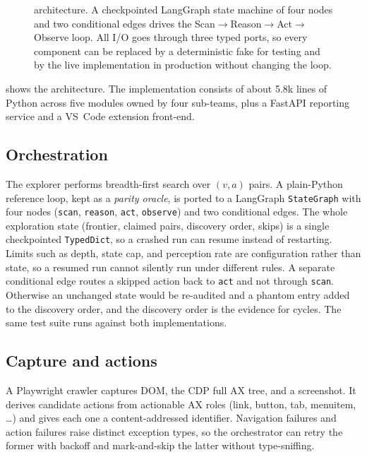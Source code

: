 \begin{figure}[t]
{}
\caption{\sys{} architecture. A checkpointed LangGraph state machine of four
nodes and two conditional edges drives the Scan$\to$Reason$\to$Act$\to$Observe
loop. All I/O goes through three typed ports, so every component can be
replaced by a deterministic fake for testing and by the live implementation in
production without changing the loop.}
\label{fig:arch}
\end{figure}

 shows the architecture. The implementation consists of about
5.8k lines of Python across five modules owned by four sub-teams, plus a
FastAPI reporting service and a VS~Code extension front-end.

\subsection{Orchestration}
The explorer performs breadth-first search over $(v,a)$ pairs. A plain-Python
reference loop, kept as a \emph{parity oracle}, is ported to a LangGraph
\texttt{StateGraph} with four nodes (\texttt{scan}, \texttt{reason},
\texttt{act}, \texttt{observe}) and two conditional edges. The whole
exploration state (frontier, claimed pairs, discovery order, skips) is a
single checkpointed \texttt{TypedDict}, so a crashed run can resume instead of
restarting. Limits such as depth, state cap, and perception rate are
configuration rather than state, so a resumed run cannot silently run under
different rules. A separate conditional edge routes a skipped action back to
\texttt{act} and not through \texttt{scan}. Otherwise an unchanged state would
be re-audited and a phantom entry added to the discovery order, and the
discovery order is the evidence for cycles. The same test suite runs against
both implementations.

\subsection{Capture and actions}
A Playwright crawler captures DOM, the CDP full AX tree, and a screenshot. It
derives candidate actions from actionable AX roles (link, button, tab,
menuitem, \dots) and gives each one a content-addressed identifier. Navigation
failures and action failures raise distinct exception types, so the
orchestrator can retry the former with backoff and mark-and-skip the latter
without type-sniffing.

